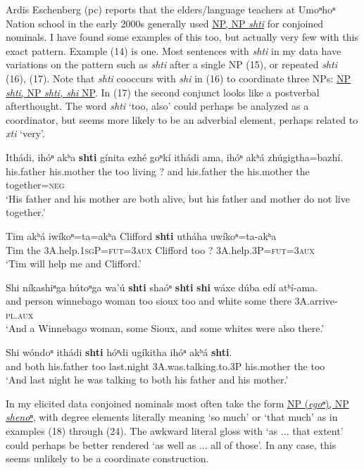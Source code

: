 \documentclass[output=paper]{LSP/langsci}
\begin{document}
Ardis Eschenberg (pc) reports that the elders/language teachers at Umoⁿhoⁿ Nation school in the early 2000s generally used \underline{NP, NP \textit{shti}} for conjoined nominals.  I have found some examples of this too, but actually very few with this exact pattern.  Example (14) is one.  Most sentences with \textit{shti} in my data have variations on the pattern such as \textit{shti} after a single NP (15), or repeated \textit{shti} (16), (17).   Note that \textit{shti} cooccurs with \textit{shi} in (16) to coordinate three NPs:  \underline{NP \textit{shti}, NP \textit{shti, shi} NP}.  In (17) the second conjunct looks like a postverbal afterthought. The word \textit{shti} `too, also' could perhaps be analyzed as a coordinator, but seems more likely to be an adverbial element, perhaps related to \textit{xti} `very'.

\ea
\gll  Ith\'adi, 	ih\'oⁿ  	akʰa 	\textbf{shti} 	g\'inita  	ezh\'e 	goⁿk\'i  	ith\'adi 	ama, 	 ih\'oⁿ 	akʰ\'a 	zh\'ugigtha=bazh\'i.\\
	his.father 	his.mother 	the 	too 	living 	?  	and  	his.father 	the 	his.mother 	the 	together=\textsc{neg}\\
\trans `His father and his mother are both alive, but his father and mother do not live 	together.'

\ex 
\gll Tim 	akʰ\'a 	iw\'ikoⁿ=ta=akʰa     Clifford \textbf{shti} uth\'aha 	uw\'ikoⁿ=ta-akʰa\\
Tim the	 \textsc{3A}.help.\textsc{1sgP}=\textsc{fut=3aux}  Clifford too 	? \textsc{3A}.help.\textsc{3P}=\textsc{fut=3aux}\\
\trans `Tim will help me and Clifford.'
  
\ex 
\gll Shi  n\'ikashiⁿga h\'utoⁿga  wa'\'u  \textbf{shti} sha\'oⁿ \textbf{shti} \textbf{shi} w\'axe d\'uba 	ed\'i 	atʰ\'i-ama.\\
and 	person  winnebago 	woman too sioux  too  and white 	some there \textsc{3A}.arrive-\textsc{pl.aux} \\
\trans `And a Winnebago woman, some Sioux, and some whites were also there.'

\ex	
\gll Shi 	w\'ondoⁿ 	ith\'adi  \textbf{shti } h\'oⁿdi 	ug\'ikitha  	ih\'oⁿ  	akʰ\'a  	\textbf{shti}.\\
	and 	both 	his.father 	too 	last.night 	\textsc{3A}.was.talking.to.\textsc{3P} 	his.mother 	the 	too\\
\trans`And last night he was talking to both his father and his mother.'
\z

In my elicited data conjoined nominals most often take the form \underline{NP (\textit{egoⁿ}), NP} \underline{\textit{shenoⁿ}}, with degree elements literally meaning `so much' or `that much' as in examples (18) through (24). The awkward literal gloss with `as ... that extent' could perhaps be better rendered `as well as ... all of those'. In any case, this seems unlikely to be a coordinate construction.
\end{document}
